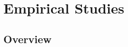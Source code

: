 \documentclass[conference]{IEEEtran}
\newcommand{\birth}[1]{\mathcal{C}(#1)}
\begin{document}
% 
% 
% 
% 
% 
% 
% 
%

\section{Empirical Studies}\label{sect:studies}

\subsection{Overview}\label{sect:study_overview}
\end{document}
